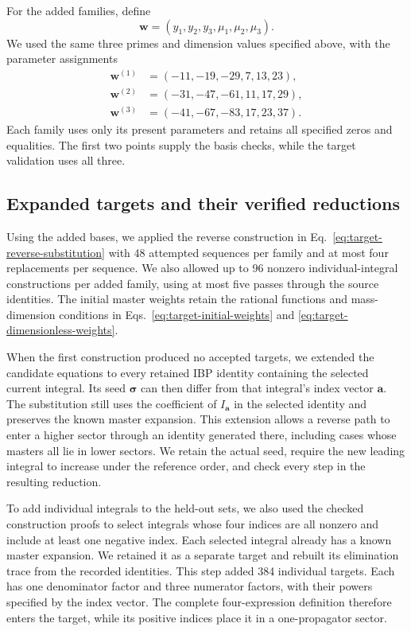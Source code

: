 \documentclass[11pt,a4paper]{article}
\begin{document}
For the added families, define
\begin{equation}
 \boldsymbol w=(y_1,y_2,y_3,\mu_1,\mu_2,\mu_3).
 \label{eq:expanded-parameters}
\end{equation}
We used the same three primes and dimension values specified above,
with the parameter assignments
\begin{equation}
 \begin{aligned}
 \boldsymbol w^{(1)}&=(-11,-19,-29,7,13,23),\\
 \boldsymbol w^{(2)}&=(-31,-47,-61,11,17,29),\\
 \boldsymbol w^{(3)}&=(-41,-67,-83,17,23,37).
 \end{aligned}
 \label{eq:expanded-samples}
\end{equation}
Each family uses only its present parameters and retains all specified
zeros and equalities. The first two points supply the basis checks,
while the target validation uses all three.

\subsection{Expanded targets and their verified reductions}
Using the added bases, we applied the reverse construction in
Eq.~\eqref{eq:target-reverse-substitution} with 48 attempted sequences
per family and at most four replacements per sequence. We also allowed
up to 96 nonzero individual-integral constructions per added family,
using at most five passes through the source identities. The initial
master weights retain the rational functions and mass-dimension
conditions in Eqs.~\eqref{eq:target-initial-weights} and
\eqref{eq:target-dimensionless-weights}.

When the first construction produced no accepted targets, we extended
the candidate equations to every retained IBP identity containing the
selected current integral. Its seed $\boldsymbol\sigma$ can then differ
from that integral's index vector $\boldsymbol a$. The substitution
still uses the coefficient of $I_{\boldsymbol a}$ in the selected
identity and preserves the known master expansion. This extension
allows a reverse path to enter a higher sector through an identity
generated there, including cases whose masters all lie in lower
sectors. We retain the actual seed, require the new leading integral
to increase under the reference order, and check every step in the
resulting reduction.

To add individual integrals to the held-out sets, we also used the
checked construction proofs to select integrals whose four indices
are all nonzero and include at least one negative index. Each selected
integral already has a known master expansion. We retained it as a
separate target and rebuilt its elimination trace from the recorded
identities. This step added 384 individual targets. Each has
one denominator factor and three numerator factors, with their powers
specified by the index vector. The complete four-expression definition
therefore enters the target, while its positive indices place it in a
one-propagator sector.
\end{document}
